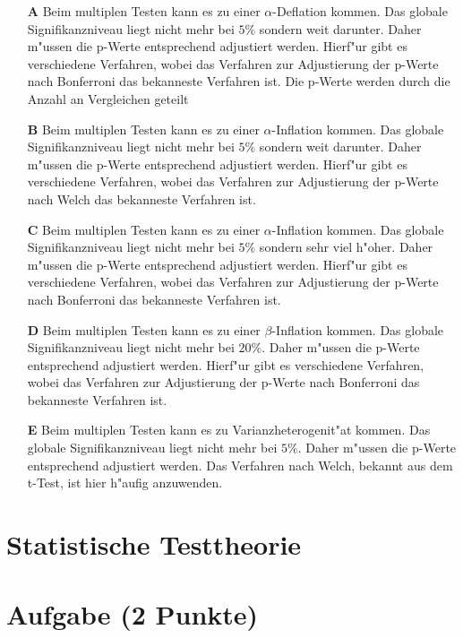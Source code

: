 \documentclass[a4paper, 9pt]{scrartcl}\usepackage[]{graphicx}\usepackage[]{xcolor}
\begin{document}
\begin{enumerate}
\item [\textbf{A} \msquare] Beim multiplen Testen kann es zu einer $\alpha$-Deflation kommen. Das globale Signifikanzniveau liegt nicht mehr bei $5\%$ sondern weit darunter. Daher m{"u}ssen die p-Werte entsprechend adjustiert werden. Hierf{"u}r gibt es verschiedene Verfahren, wobei das Verfahren zur Adjustierung der p-Werte nach Bonferroni das bekanneste Verfahren ist. Die p-Werte werden durch die Anzahl an Vergleichen geteilt
\item [\textbf{B} \msquare] Beim multiplen Testen kann es zu einer $\alpha$-Inflation kommen. Das globale Signifikanzniveau liegt nicht mehr bei $5\%$ sondern weit darunter. Daher m{"u}ssen die p-Werte entsprechend adjustiert werden. Hierf{"u}r gibt es verschiedene Verfahren, wobei das Verfahren zur Adjustierung der p-Werte nach Welch das bekanneste Verfahren ist.
\item [\textbf{C} \msquare] Beim multiplen Testen kann es zu einer $\alpha$-Inflation kommen. Das globale Signifikanzniveau liegt nicht mehr bei $5\%$ sondern sehr viel h{"o}her. Daher m{"u}ssen die p-Werte entsprechend adjustiert werden. Hierf{"u}r gibt es verschiedene Verfahren, wobei das Verfahren zur Adjustierung der p-Werte nach Bonferroni das bekanneste Verfahren ist.
\item [\textbf{D} \msquare] Beim multiplen Testen kann es zu einer $\beta$-Inflation kommen. Das globale Signifikanzniveau liegt nicht mehr bei $20\%$. Daher m{"u}ssen die p-Werte entsprechend adjustiert werden. Hierf{"u}r gibt es verschiedene Verfahren, wobei das Verfahren zur Adjustierung der p-Werte nach Bonferroni das bekanneste Verfahren ist.
\item [\textbf{E} \msquare] Beim multiplen Testen kann es zu Varianzheterogenit{"a}t kommen. Das globale Signifikanzniveau liegt nicht mehr bei $5\%$. Daher m{"u}ssen die p-Werte entsprechend adjustiert werden. Das Verfahren nach Welch, bekannt aus dem t-Test, ist hier h{"a}ufig anzuwenden.
\end{enumerate}
\section*{Statistische Testtheorie}  

\section{Aufgabe \hfill (2 Punkte)}
\end{document}
